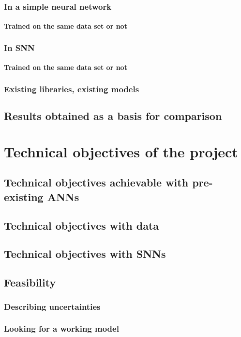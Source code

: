 \documentclass{article}
\begin{document}
\subsubsection{In a simple neural network}
\paragraph{Trained on the same data set or not}
\subsubsection{In SNN}
\paragraph{Trained on the same data set or not}
\subsubsection{Existing libraries, existing models}
\subsection{Results obtained as a basis for comparison}

\section{Technical objectives of the project}
\subsection{Technical objectives achievable with pre-existing ANNs}
\subsection{Technical objectives with data}
\subsection{Technical objectives with SNNs}
\subsection{Feasibility}
\subsubsection{Describing uncertainties}
\subsubsection{Looking for a working model}
\end{document}
